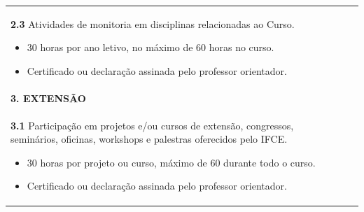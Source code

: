 \documentclass[
	12pt,				%
	openright,			%
	twoside,			%
	a4paper,			%
	chapter=TITLE,		%
	english,			%
	french,				%
	spanish,			%
	brazil,				%
	]{abntex2}
\begin{document}
\begin{quadro}
{\begin{tabularx}{\textwidth}{X X}
	\textbf{2.3}  Atividades de monitoria em disciplinas relacionadas ao Curso.
	\begin{itemize}[itemsep=-0.25em, topsep=0em]
 	  \item[\faClockO] 30 horas por ano letivo, no máximo de 60 horas no curso. 
 	  \item[\faCheckCircle]  Certificado ou declaração assinada pelo professor orientador.  \vspace{-1em}
	\end{itemize} \\
	
	

	\cellcolor{gray!20}\bfseries{3. EXTENS\~AO} \\
	\cellcolor{gray!02}\textbf{3.1} Participação em projetos e/ou cursos de extensão, congressos, seminários, oficinas, workshops e  palestras oferecidos pelo IFCE. 
	\begin{itemize}[itemsep=-0.25em, topsep=0em]
 	  \item[\faClockO]  30 horas por projeto ou curso, máximo de 60 durante todo o curso. 
 	  \item[\faCheckCircle] Certificado ou declaração assinada pelo professor orientador.
 	\end{itemize}


\end{tabularx}
	}{}
\end{quadro}
\end{document}
